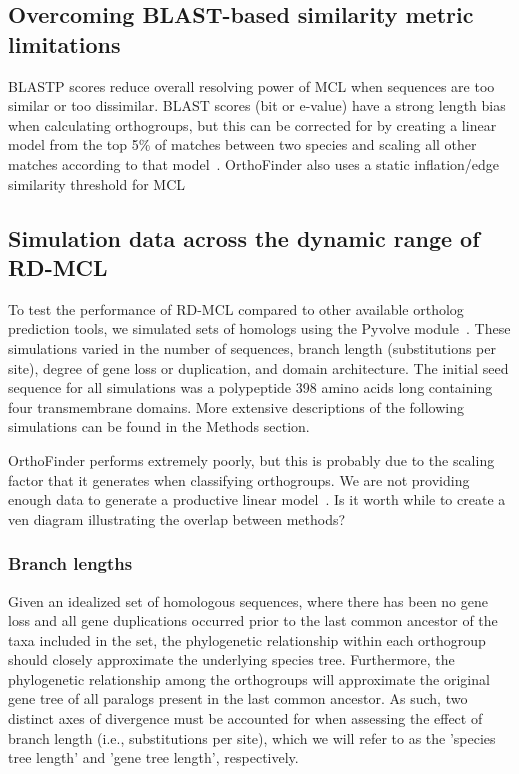 \documentclass[twocolumn]{bmcart}%
\begin{document}
\subsection{Overcoming BLAST-based similarity metric limitations}\label{subsec:overcomingBlast-basedSimilarityMetricLimitations}
BLASTP scores reduce overall resolving power of MCL when sequences are too similar or too dissimilar.
BLAST scores (bit or e-value) have a strong length bias when calculating orthogroups, but this can be corrected for by creating a linear model from the top 5\% of matches between two species and scaling all other matches according to that model~\cite{Emms:2015ig}.
OrthoFinder also uses a static inflation/edge similarity threshold for MCL~\cite{Emms:2015ig}


\subsection{Simulation data across the dynamic range of RD-MCL}\label{subsec:simulationDataAcrossTheDynamicRangeOfRd-mcl}
To test the performance of RD-MCL compared to other available ortholog prediction tools, we simulated sets of homologs using the Pyvolve module~\cite{Spielman:2015kv}.
These simulations varied in the number of sequences, branch length (substitutions per site), degree of gene loss or duplication, and domain architecture.
The initial seed sequence for all simulations was a polypeptide 398 amino acids long containing four transmembrane domains.
More extensive descriptions of the following simulations can be found in the Methods section.

OrthoFinder performs extremely poorly, but this is probably due to the scaling factor that it generates when classifying orthogroups.
We are not providing enough data to generate a productive linear model~\cite{Emms:2015ig}.
Is it worth while to create a ven diagram illustrating the overlap between methods?

\subsubsection{Branch lengths}
Given an idealized set of homologous sequences, where there has been no gene loss and all gene duplications occurred prior to the last common ancestor of the taxa included in the set, the phylogenetic relationship within each orthogroup should closely approximate the underlying species tree.
Furthermore, the phylogenetic relationship among the orthogroups will approximate the original gene tree of all paralogs present in the last common ancestor.
As such, two distinct axes of divergence must be accounted for when assessing the effect of branch length (i.e., substitutions per site), which we will refer to as the 'species tree length' and 'gene tree length', respectively.
\end{document}
